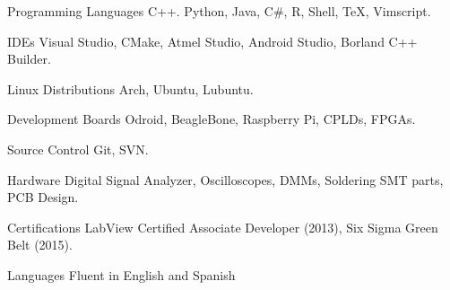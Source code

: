 
\begin{cvskills}


	\cvskill
		{Programming Languages}
			{C++. Python, Java, C\#, R, Shell, \TeX, Vimscript.}

	\cvskill
		{IDEs}
			{Visual Studio, CMake, Atmel Studio, Android Studio, Borland C++ Builder.}

	\cvskill
		{Linux Distributions}
			{Arch, Ubuntu, Lubuntu.}

	\cvskill
		{Development Boards}
			{Odroid, BeagleBone, Raspberry Pi, CPLDs, FPGAs.}

	\cvskill
		{Source Control}
			{Git, SVN.}

	\cvskill
		{Hardware}
			{Digital Signal Analyzer, Oscilloscopes, DMMs, Soldering SMT parts, PCB Design.}

	\cvskill
		{Certifications}
			{LabView Certified Associate Developer (2013), Six Sigma Green Belt (2015).}

	\cvskill
		{Languages}
			{Fluent in English and Spanish}

\end{cvskills}
